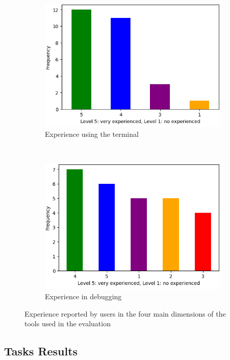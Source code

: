 \begin{figure}[hptb]
\begin{subfigure}[b]{0.45\textwidth}
        \includegraphics[width=\textwidth]{figures/experience-terminal}
        \caption{Experience using the terminal}
        \label{fig:terminal-experience}
    \end{subfigure}
    ~ 
    \begin{subfigure}[b]{0.45\textwidth}
        \centering
        \includegraphics[width=\textwidth]{figures/experience-debuggers}
        \caption{Experience in debugging}
        \label{fig:debugging-experience}
    \end{subfigure}
    \caption{Experience reported by users in the four main dimensions of the tools used in the evaluation}
    \label{fig:general-know}
\end{figure}


\subsection{Tasks Results}
\label{sec:tasks-results}

